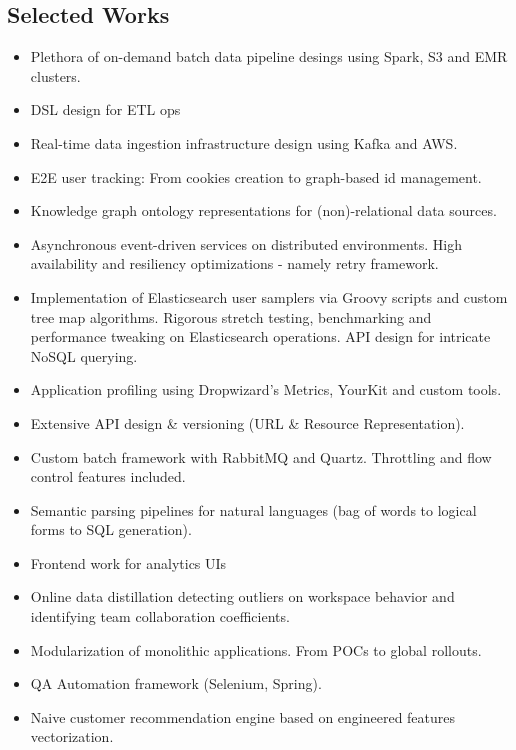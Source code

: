\documentclass{article}
\begin{document}
	\vspace{+0.5cm}
	\begin{multicols}{2}
	
		\section*{\color{NavyBlue}Selected Works}
		\vspace{-0.5cm}
		{\color{NavyBlue}\hrulefill}
			\begin{itemize}
				\item Plethora of on-demand batch data pipeline desings using Spark, S3 and EMR clusters.
				\item DSL design for ETL ops
				\item Real-time data ingestion infrastructure design using Kafka and AWS.
				\item E2E user tracking: From cookies creation to graph-based id management.
				\item Knowledge graph ontology representations for (non)-relational data sources.
				\item Asynchronous event-driven services on distributed environments. High availability and resiliency optimizations - namely retry framework.
				\item Implementation of Elasticsearch user samplers via Groovy scripts and custom tree map algorithms. Rigorous stretch testing, benchmarking and performance tweaking on Elasticsearch operations. API design for intricate NoSQL querying.
				\item Application profiling using Dropwizard’s Metrics, YourKit and custom tools.
				\item Extensive API design \& versioning (URL \& Resource Representation).
				\item Custom batch framework with RabbitMQ and Quartz. Throttling and flow control features included.
				\item Semantic parsing pipelines for natural languages (bag of words to logical forms to SQL generation).
				\item Frontend work for analytics UIs
				\item Online data distillation detecting outliers on workspace behavior and identifying team collaboration coefficients.
				\item Modularization of monolithic applications. From POCs to global rollouts.
				\item QA Automation framework (Selenium, Spring).
				\item Naive customer recommendation engine based on engineered features vectorization.

\end{itemize}
\end{multicols}
\end{document}
